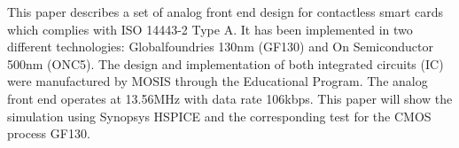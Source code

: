 This paper describes a set of analog front end design for contactless smart cards which complies with ISO 14443-2 Type A. It has been implemented in two different technologies: Globalfoundries 130nm (GF130) and On Semiconductor 500nm (ONC5). The design and implementation of both integrated circuits (IC) were manufactured by MOSIS through the Educational Program. The analog front end operates at 13.56MHz with data rate 106kbps. This paper will show the simulation using Synopsys HSPICE and the corresponding test for the CMOS process GF130.